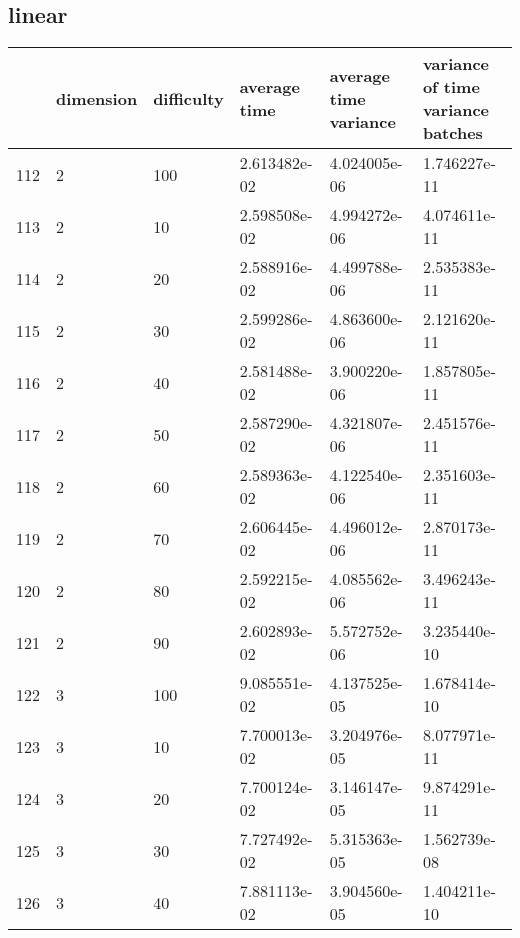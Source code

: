 \documentclass{article}
\begin{document}
\subsection{linear}
\begin{center}
\begin{tabular}{llllll}
\toprule
{} & dimension & difficulty &  average time & average time variance & variance of time variance batches \\
\midrule
112 &         2 &        100 &  2.613482e-02 &          4.024005e-06 &                      1.746227e-11 \\
113 &         2 &         10 &  2.598508e-02 &          4.994272e-06 &                      4.074611e-11 \\
114 &         2 &         20 &  2.588916e-02 &          4.499788e-06 &                      2.535383e-11 \\
115 &         2 &         30 &  2.599286e-02 &          4.863600e-06 &                      2.121620e-11 \\
116 &         2 &         40 &  2.581488e-02 &          3.900220e-06 &                      1.857805e-11 \\
117 &         2 &         50 &  2.587290e-02 &          4.321807e-06 &                      2.451576e-11 \\
118 &         2 &         60 &  2.589363e-02 &          4.122540e-06 &                      2.351603e-11 \\
119 &         2 &         70 &  2.606445e-02 &          4.496012e-06 &                      2.870173e-11 \\
120 &         2 &         80 &  2.592215e-02 &          4.085562e-06 &                      3.496243e-11 \\
121 &         2 &         90 &  2.602893e-02 &          5.572752e-06 &                      3.235440e-10 \\
122 &         3 &        100 &  9.085551e-02 &          4.137525e-05 &                      1.678414e-10 \\
123 &         3 &         10 &  7.700013e-02 &          3.204976e-05 &                      8.077971e-11 \\
124 &         3 &         20 &  7.700124e-02 &          3.146147e-05 &                      9.874291e-11 \\
125 &         3 &         30 &  7.727492e-02 &          5.315363e-05 &                      1.562739e-08 \\
126 &         3 &         40 &  7.881113e-02 &          3.904560e-05 &                      1.404211e-10 \\

\end{tabular}
\end{center}
\end{document}

